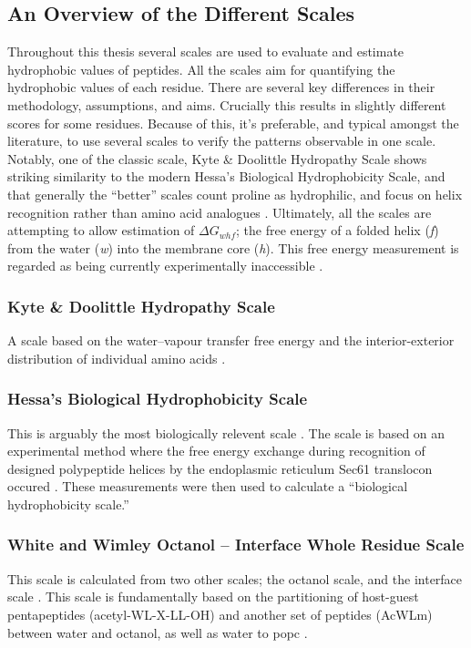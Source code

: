 \subsection{An Overview of the Different Scales}
Throughout this thesis several scales are used to evaluate and estimate hydrophobic values of peptides. All the scales aim for quantifying the hydrophobic values of each residue. There are several key differences in their methodology, assumptions, and aims. Crucially this results in slightly different scores for some residues. Because of this, it's preferable, and typical amongst the literature, to use several scales to verify the patterns observable in one scale. Notably, one of the classic scale, Kyte \& Doolittle Hydropathy Scale shows striking similarity to the modern Hessa's Biological Hydrophobicity Scale, and that generally the ``better'' scales count proline as hydrophilic, and focus on helix recognition rather than amino acid analogues \cite{Peters2014}. Ultimately, all the scales are attempting to allow estimation of ${\Delta G}_{whf}$; the free energy of a folded helix ({\it f}) from the water ({\it w}) into the membrane core ({\it h}). This free energy measurement is regarded as being currently experimentally inaccessible \cite{Cymer2014}.


\subsubsection{Kyte \& Doolittle Hydropathy Scale}
A scale based on the water\---vapour transfer free energy and the interior-exterior distribution of individual amino acids \cite{Kyte1982}.

\subsubsection{Hessa's Biological Hydrophobicity Scale}
This is arguably the most biologically relevent scale \cite{Peters2014}. The scale is based on an experimental method where the free energy exchange during recognition of designed polypeptide helices by the endoplasmic reticulum Sec61 translocon occured \cite{Hessa2005}. These measurements were then used to calculate a “biological hydrophobicity scale.”

\subsubsection{White and Wimley Octanol \--- Interface Whole Residue Scale}
This scale is calculated from two other scales; the octanol scale, and the interface scale \cite{White1999}. This scale is fundamentally based on the partitioning of host-guest pentapeptides (acetyl-WL-X-LL-OH) and another set of peptides (AcWLm) between water and octanol, as well as water to \gls{popc} .


